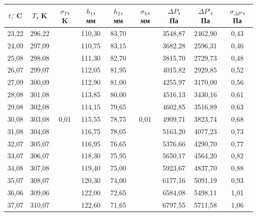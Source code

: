 \documentclass[a4paper, 12pt]{article}
\begin{document}
    \begin{table}[H]
        \centering
        \begin{tabular}{|c|c|c|c|c|c|c|c|c|}
        \hline
        $t, ^\circ$C & $T$, K & $\sigma_T$, K & $h_1$, мм & $h_2$, мм & $\sigma_h$, мм & $\Delta P$, Па & $\Delta P'$, Па & $\sigma_{\Delta P'}$, Па \\ \hline
        23,22 & 296,22 & \multirow{18}{*}{0,01} & 110,30 & 83,70 & \multirow{18}{*}{0,01} & 3548,87 & 2462,90 & 0,43 \\ \cline{1-2} \cline{4-5} \cline{7-9} 
        24,09 & 297,09 &  & 110,75 & 83,15 &  & 3682,28 & 2596,31 & 0,46 \\ \cline{1-2} \cline{4-5} \cline{7-9} 
        25,08 & 298,08 &  & 111,30 & 82,70 &  & 3815,70 & 2729,73 & 0,48 \\ \cline{1-2} \cline{4-5} \cline{7-9} 
        26,07 & 299,07 &  & 112,05 & 81,95 &  & 4015,82 & 2929,85 & 0,52 \\ \cline{1-2} \cline{4-5} \cline{7-9} 
        27,09 & 300,09 &  & 112,90 & 81,00 &  & 4255,97 & 3170,00 & 0,56 \\ \cline{1-2} \cline{4-5} \cline{7-9} 
        28,08 & 301,08 &  & 113,85 & 80,00 &  & 4516,13 & 3430,16 & 0,61 \\ \cline{1-2} \cline{4-5} \cline{7-9} 
        29,08 & 302,08 &  & 114,15 & 79,65 &  & 4602,85 & 3516,89 & 0,63 \\ \cline{1-2} \cline{4-5} \cline{7-9} 
        30,08 & 303,08 &  & 115,55 & 78,75 &  & 4909,71 & 3823,74 & 0,68 \\ \cline{1-2} \cline{4-5} \cline{7-9} 
        31,08 & 304,08 &  & 116,75 & 78,05 &  & 5163,20 & 4077,23 & 0,73 \\ \cline{1-2} \cline{4-5} \cline{7-9} 
        32,07 & 305,07 &  & 116,95 & 76,65 &  & 5376,66 & 4290,70 & 0,77 \\ \cline{1-2} \cline{4-5} \cline{7-9} 
        33,07 & 306,07 &  & 118,30 & 75,95 &  & 5650,17 & 4564,20 & 0,82 \\ \cline{1-2} \cline{4-5} \cline{7-9} 
        34,08 & 307,08 &  & 119,40 & 75,00 &  & 5923,67 & 4837,70 & 0,88 \\ \cline{1-2} \cline{4-5} \cline{7-9} 
        35,07 & 308,07 &  & 120,30 & 74,00 &  & 6177,16 & 5091,19 & 0,93 \\ \cline{1-2} \cline{4-5} \cline{7-9} 
        36,06 & 309,06 &  & 122,00 & 72,65 &  & 6584,08 & 5498,11 & 1,01 \\ \cline{1-2} \cline{4-5} \cline{7-9} 
        37,07 & 310,07 &  & 122,60 & 71,65 &  & 6797,55 & 5711,58 & 1,06 \\ \cline{1-2} \cline{4-5} \cline{7-9} 

\end{tabular}
\end{table}
\end{document}

